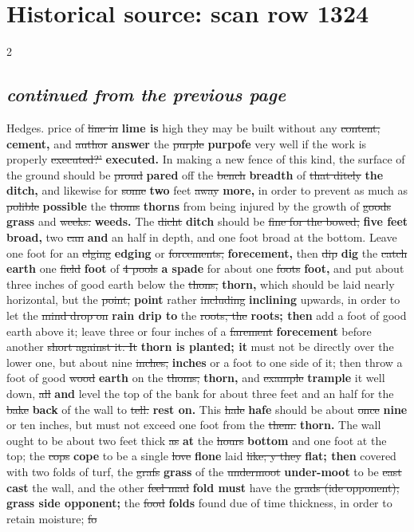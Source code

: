 \documentclass[10pt]{article}
\begin{document}
\section*{Historical source: scan row 1324}
\begin{multicols}{2}
\subsection*{\textit{continued from the previous page}}
Hedges. price of \sout{line in} \textbf{lime is} high they may be built without any \sout{content,} \textbf{cement,} and \sout{author} \textbf{answer} the \sout{purple} \textbf{purpofe} very well if the work is properly \sout{executed?’} \textbf{executed.} In making a new fence of this kind, the surface of the ground should be \sout{proud} \textbf{pared} off the \sout{bench} \textbf{breadth} of \sout{that ditely} \textbf{the ditch,} and likewise for \sout{some} \textbf{two} feet \sout{away} \textbf{more,} in order to prevent as much as \sout{polible} \textbf{possible} the \sout{thoms} \textbf{thorns} from being injured by the growth of \sout{goods} \textbf{grass} and \sout{weeks.} \textbf{weeds.} The \sout{dicht} \textbf{ditch} should be \sout{fine for the bowed,} \textbf{five feet broad,} two \sout{can} \textbf{and} an half in depth, and one foot broad at the bottom. Leave one foot for an \sout{elging} \textbf{edging} or \sout{forcements,} \textbf{forecement,} then \sout{dip} \textbf{dig} the \sout{catch} \textbf{earth} one \sout{field} \textbf{foot} of \sout{4 pools} \textbf{a spade} for about one \sout{foots} \textbf{foot,} and put about three inches of good earth below the \sout{thons,} \textbf{thorn,} which should be laid nearly horizontal, but the \sout{point,} \textbf{point} rather \sout{including} \textbf{inclining} upwards, in order to let the \sout{mind drop on} \textbf{rain drip to} the \sout{roots, the} \textbf{roots; then} add a foot of good earth above it; leave three or four inches of a \sout{farement} \textbf{forecement} before another \sout{short against it. It} \textbf{thorn is planted; it} must not be directly over the lower one, but about nine \sout{inches,} \textbf{inches} or a foot to one side of it; then throw a foot of good \sout{wood} \textbf{earth} on the \sout{thoms,} \textbf{thorn,} and \sout{example} \textbf{trample} it well down, \sout{all} \textbf{and} level the top of the bank for about three feet and an half for the \sout{bake} \textbf{back} of the wall to \sout{tell.} \textbf{rest on.} This \sout{hale} \textbf{hafe} should be about \sout{once} \textbf{nine} or ten inches, but must not exceed one foot from the \sout{them.} \textbf{thorn.} The wall ought to be about two feet thick \sout{as} \textbf{at} the \sout{hours} \textbf{bottom} and one foot at the top; the \sout{cops} \textbf{cope} to be a single \sout{love} \textbf{flone} laid \sout{like; y they} \textbf{flat; then} covered with two folds of turf, the \sout{grafs} \textbf{grass} of the \sout{undermoot} \textbf{under-moot} to be \sout{east} \textbf{cast} the wall, and the other \sout{feel mad} \textbf{fold must} have the \sout{grads (ide opponent);} \textbf{grass side opponent;} the \sout{food} \textbf{folds} found due of time thickness, in order to retain moisture; \sout{fo} 
\end{multicols}
\end{document}
